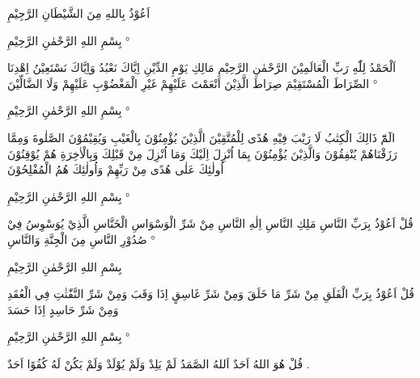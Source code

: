 \begin{twocol}
\begin{rightcol}
اَعُوْذُ بِاللهِ مِنَ الشَّيْطَانِ الرَّجِيْمِ
\par
بِسْمِ اللهِ الرَّحْمٰنِ الرَّحِيْمِ {\latinfont°}
\par
اَلْحَمْدُ لِلّٰهِ رَبِّ الْعَالَمِيْنَ الرَّحْمٰنِ الرَّحِيْمِ مَالِكِ يَوْمِ الدِّيْنِ اِيَّاكَ نَعْبُدُ وَاِيَّاكَ نَسْتَعِيْنُ اِهْدِنَا الصِّرَاطَ الْمُسْتَقِيْمَ صِرَاطَ الَّذِيْنَ اَنْعَمْتَ عَلَيْهِمْ غَيْرِ الْمَغْضُوْبِ عَلَيْهِمْ وَلَا الضَّالِّيْنَ {\latinfont°}
\par
بِسْمِ اللهِ الرَّحْمٰنِ الرَّحِيْمِ {\latinfont°}
\par
الٓمّٓ ذَالِكَ الْكِتٰبُ لَا رَيْبَ فِيْهِ هُدًى لِلْمُتَّقِيْنَ الَّذِيْنَ يُؤْمِنُوْنَ بِالْغَيْبِ وَيُقِيْمُوْنَ الصَّلٰوةَ وَمِمَّا رَزَقْنَاهُمْ يُنْفِقُوْنَ وَالَّذِيْنَ يُؤْمِنُوْنَ بِمَا اُنْزِلَ اِلَيْكَ وَمَا اُنْزِلَ مِنْ قَبْلِكَ وَبِالْاٰخِرَةِ هُمْ يُوْقِنُوْنَ اُولٰئِكَ عَلٰى هُدًى مِنْ رَبِّهِمْ وَاُولٰئِكَ هُمُ الْمُفْلِحُوْنَ
\par
بِسْمِ اللهِ الرَّحْمٰنِ الرَّحِيْمِ {\latinfont°}
\par
قُلْ اَعُوْذُ بِرَبِّ النَّاسِ مَلِكِ النَّاسِ اِلٰهِ النَّاسِ مِنْ شَرِّ الْوَسْوَاسِ الْخَنَّاسِ الَّذِيْ يُوَسْوِسُ فِيْ صُدُوْرِ النَّاسِ مِنَ الْجِنَّةِ وَالنَّاسِ {\latinfont°}
\par
\end{rightcol}
\begin{leftcol}
بِسْمِ اللهِ الرَّحْمٰنِ الرَّحِيْمِ
\par
قُلْ اَعُوْذُ بِرَبِّ الْفَلَقِ مِنْ شَرِّ مَا خَلَقَ وَمِنْ شَرِّ غَاسِقٍ اِذَا وَقَبَ وَمِنْ شَرِّ النَّفّٰثٰتِ فِي الْعُقَدِ وَمِنْ شَرِّ حَاسِدٍ اِذَا حَسَدَ
\par
بِسْمِ اللهِ الرَّحْمٰنِ الرَّحِيْمِ {\latinfont°}
\par
قُلْ هُوَ اللهُ اَحَدٌ اَللهُ الصَّمَدُ لَمْ يَلِدْ وَلَمْ يُوْلَدْ وَلَمْ يَكُنْ لَهُ كُفُوًا اَحَدٌ .

\end{leftcol}
\end{twocol}
